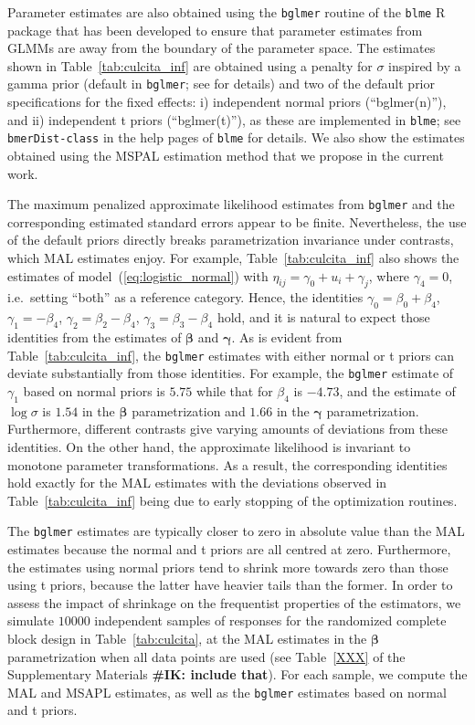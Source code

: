\documentclass[11pt, a4paper]{article}
\newcommand*{\bb}{\boldsymbol}
\newcommand{\IK}[1]{{\noindent \color{blue} \bf \#IK: #1}}
\theoremstyle{example} \newtheorem{example}{Example}[section]
\theoremstyle{theorem} \newtheorem{theorem}{Theorem}[section]
\def\bbeta{\bb{\beta}}
\def\bgamma{\bb{\gamma}}
\def\bgamma{\bb{\gamma}}
\begin{document}
Parameter estimates are also obtained using the \texttt{bglmer}
routine of the \texttt{blme} R package \citep{chung+etal:2013} that has
been developed to ensure that parameter estimates from GLMMs are away
from the boundary of the parameter space. The estimates shown in
Table~\ref{tab:culcita_inf} are obtained using a penalty for $\sigma$
inspired by a gamma prior (default in \texttt{bglmer}; see
\citealt{chung+etal:2013} for details) and two of the default prior
specifications for the fixed effects: i) independent normal priors
(``bglmer(n)''), and ii) independent t priors (``bglmer(t)''), as
these are implemented in \texttt{blme}; see \texttt{bmerDist-class} in
the help pages of \texttt{blme} for details. We also show the
estimates obtained using the MSPAL estimation method that we propose
in the current work.

The maximum penalized approximate likelihood estimates from
\texttt{bglmer} and the corresponding estimated standard errors appear to
be finite. Nevertheless, the use of the default priors directly breaks
parametrization invariance under contrasts, which MAL estimates
enjoy. For example, Table~\ref{tab:culcita_inf} also shows the
estimates of model~(\ref{eq:logistic_normal}) with
$\eta_{ij} = \gamma_0 + u_i + \gamma_{j}$, where $\gamma_{4} = 0$,
i.e.~setting ``both'' as a reference category. Hence, the identities
$\gamma_0 = \beta_0 + \beta_4$, $\gamma_1 = -\beta_4$,
$\gamma_2 = \beta_2 - \beta_4$, $\gamma_3 = \beta_3 - \beta_4$ hold,
and it is natural to expect those identities from the estimates of
$\bbeta$ and $\bgamma$. As is evident from
Table~\ref{tab:culcita_inf}, the \texttt{bglmer} estimates with either
normal or t priors can deviate substantially from those
identities. For example, the \texttt{bglmer} estimate of $\gamma_1$
based on normal priors is $5.75$ while that for $\beta_4$ is $-4.73$,
and the estimate of $\log\sigma$ is $1.54$ in the $\bbeta$
parametrization and $1.66$ in the $\bgamma$
parametrization. Furthermore, different contrasts give varying
amounts of deviations from these identities. On the other hand, the
approximate likelihood is invariant to monotone parameter
transformations. As a result, the corresponding identities hold
exactly for the MAL estimates with the deviations observed in
Table~\ref{tab:culcita_inf} being due to early stopping of the optimization routines.

The \texttt{bglmer} estimates are typically closer to zero in absolute
value than the MAL estimates because the normal and t priors are all
centred at zero. Furthermore, the estimates using normal priors tend
to shrink more towards zero than those using t priors, because the
latter have heavier tails than the former. In order to assess the
impact of shrinkage on the frequentist properties of the estimators,
we simulate $10000$ independent samples of responses for the randomized
complete block design in Table~\ref{tab:culcita}, at the MAL estimates
in the $\bbeta$ parametrization when all data points are used (see
Table~\ref{XXX} of the Supplementary Materials  \IK{include that}). For each sample, we
compute the MAL and MSAPL estimates, as well as the \texttt{bglmer} estimates based on
normal and t priors.
\end{document}
